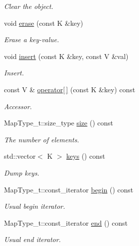 \begin{DoxyCompactItemize}
\begin{DoxyCompactList}\small\item\em Clear the object. \end{DoxyCompactList}\item 
void \mbox{\hyperlink{classADAT_1_1OrderedMapObject_af5d9aad7f7a1ce462dfed9cbe13c638c}{erase}} (const K \&key)
\begin{DoxyCompactList}\small\item\em Erase a key-\/value. \end{DoxyCompactList}\item 
void \mbox{\hyperlink{classADAT_1_1OrderedMapObject_a6466cef0224cef7a1e943b32da6e3410}{insert}} (const K \&key, const V \&val)
\begin{DoxyCompactList}\small\item\em Insert. \end{DoxyCompactList}\item 
const V \& \mbox{\hyperlink{classADAT_1_1OrderedMapObject_ad6bf82315b8676a1e7a5733ad6d48e85}{operator\mbox{[}$\,$\mbox{]}}} (const K \&key) const
\begin{DoxyCompactList}\small\item\em Accessor. \end{DoxyCompactList}\item 
Map\+Type\+\_\+t\+::size\+\_\+type \mbox{\hyperlink{classADAT_1_1OrderedMapObject_a3d96d76de0ad61fb858509543c3f60f4}{size}} () const
\begin{DoxyCompactList}\small\item\em The number of elements. \end{DoxyCompactList}\item 
std\+::vector$<$ K $>$ \mbox{\hyperlink{classADAT_1_1OrderedMapObject_ad376a69c5761afe8fe44d3a24c44ba4c}{keys}} () const
\begin{DoxyCompactList}\small\item\em Dump keys. \end{DoxyCompactList}\item 
Map\+Type\+\_\+t\+::const\+\_\+iterator \mbox{\hyperlink{classADAT_1_1OrderedMapObject_afe44774d4a446c8f66ea5d6bd2c5d59f}{begin}} () const
\begin{DoxyCompactList}\small\item\em Usual begin iterator. \end{DoxyCompactList}\item 
Map\+Type\+\_\+t\+::const\+\_\+iterator \mbox{\hyperlink{classADAT_1_1OrderedMapObject_ae6ad157b81bdf303beaee4422f313ed4}{end}} () const
\begin{DoxyCompactList}\small\item\em Usual end iterator. \end{DoxyCompactList}\end{DoxyCompactItemize}


